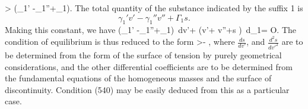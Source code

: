 \documentclass[12pt]{memoir}
\begin{document}
{\eqs \sigma {}> \left(\gamma_1' -\gamma_1''+\Gamma_1\right). \label{545}\eqe
The total quantity of the substance indicated by the suffix 1 is
$$\gamma_1' v'-\gamma_1''v''+\Gamma_1 s.$$
Making this constant, we have
\eqs
\left(\gamma_1' -\gamma_1''+\Gamma_1\right)\, dv'+
\left(v'+ v''+s \right)\, d\mu_1= O. \label{546}\eqe
The condition of equilibrium is thus reduced to the form
\eqs \sigma {}>- ,\label{547}\eqe
where $\frac{ds}{dv'}$, and $\frac{d^2s}{dv'^2}$ are to be determined from the form of the surface of tension by purely geometrical considerations, and the other differential coefficients are to be determined from the fundamental equations of the homogeneous masses and the surface of discontinuity. Condition (540) may be easily deduced from this as a particular case.

}
\end{document}
